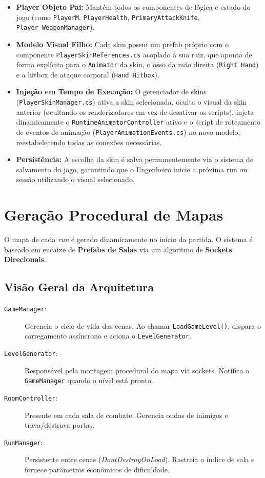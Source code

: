 \documentclass[a4paper,12pt]{report}
\begin{document}
\begin{itemize}
    \item \textbf{Player Objeto Pai:} Mantém todos os componentes de lógica e estado do jogo (como \texttt{PlayerM}, \texttt{PlayerHealth}, \texttt{PrimaryAttackKnife}, \texttt{Player\_WeaponManager}).
    \item \textbf{Modelo Visual Filho:} Cada skin possui um prefab próprio com o componente \texttt{PlayerSkinReferences.cs} acoplado à sua raiz, que aponta de forma explícita para o \texttt{Animator} da skin, o osso da mão direita (\texttt{Right Hand}) e a hitbox de ataque corporal (\texttt{Hand Hitbox}).
    \item \textbf{Injeção em Tempo de Execução:} O gerenciador de skins (\texttt{PlayerSkinManager.cs}) ativa a skin selecionada, oculta o visual da skin anterior (ocultando os renderizadores em vez de desativar os scripts), injeta dinamicamente o \texttt{RuntimeAnimatorController} ativo e o script de roteamento de eventos de animação (\texttt{PlayerAnimationEvents.cs}) no novo modelo, reestabelecendo todas as conexões necessárias.
    \item \textbf{Persistência:} A escolha da skin é salva permanentemente via o sistema de salvamento do jogo, garantindo que o Engenheiro inicie a próxima run ou sessão utilizando o visual selecionado.
\end{itemize}

\chapter{Geração Procedural de Mapas}\label{cap:geracao}

O mapa de cada \textit{run} é gerado dinamicamente no início da partida. O sistema é baseado em encaixe de \textbf{Prefabs de Salas} via um algoritmo de \textbf{Sockets Direcionais}.

\section{Visão Geral da Arquitetura}
\begin{description}
    \item[\texttt{GameManager}:] Gerencia o ciclo de vida das cenas. Ao chamar \texttt{LoadGameLevel()}, dispara o carregamento assíncrono e aciona o \texttt{LevelGenerator}.
    \item[\texttt{LevelGenerator}:] Responsável pela montagem procedural do mapa via sockets. Notifica o \texttt{GameManager} quando o nível está pronto.
    \item[\texttt{RoomController}:] Presente em cada sala de combate. Gerencia ondas de inimigos e trava/destrava portas.
    \item[\texttt{RunManager}:] Persistente entre cenas (\textit{DontDestroyOnLoad}). Rastreia o índice de sala e fornece parâmetros econômicos de dificuldade.
\end{description}
\end{document}
